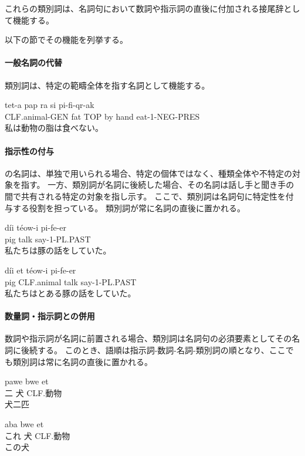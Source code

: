 これらの類別詞は、名詞句において数詞や指示詞の直後に付加される接尾辞として機能する。

以下の節でその機能を列挙する。

\paragraph{一般名詞の代替}
類別詞は、特定の範疇全体を指す名詞として機能する。
\begin{exe}
\ex \gll tet-a pap ra si pi-fi-qr-ak\\
        CLF.animal-GEN fat TOP by hand eat-1-NEG-PRES\\
\glt 私は動物の脂は食べない。
\end{exe}

\paragraph{指示性の付与}

\langname の名詞は、単独で用いられる場合、特定の個体ではなく、種類全体や不特定の対象を指す。
一方、類別詞が名詞に後続した場合、その名詞は話し手と聞き手の間で共有される特定の対象を指し示す。
ここで、類別詞は名詞句に特定性を付与する役割を担っている。
類別詞が常に名詞の直後に置かれる。
\begin{exe}
\ex \gll d\'ii t\'eow-i pi-fe-er\\
pig talk say-1-PL.PAST \\
\glt 私たちは豚の話をしていた。
\end{exe}
\begin{exe}
\ex \gll d\'ii et t\'eow-i pi-fe-er\\
pig CLF.animal talk say-1-PL.PAST \\
\glt 私たちはとある豚の話をしていた。
\end{exe}

\paragraph{数量詞・指示詞との併用}

数詞や指示詞が名詞に前置される場合、類別詞は名詞句の必須要素としてその名詞に後続する。
このとき、語順は指示詞-数詞-名詞-類別詞の順となり、ここでも類別詞は常に名詞の直後に置かれる。
\begin{exe}
\ex \gll pawe bwe et\\
二 犬 CLF.動物\\
\glt 犬二匹
\end{exe}
\begin{exe}
\ex \gll aba bwe et\\
これ 犬 CLF.動物\\
\glt この犬
\end{exe}


